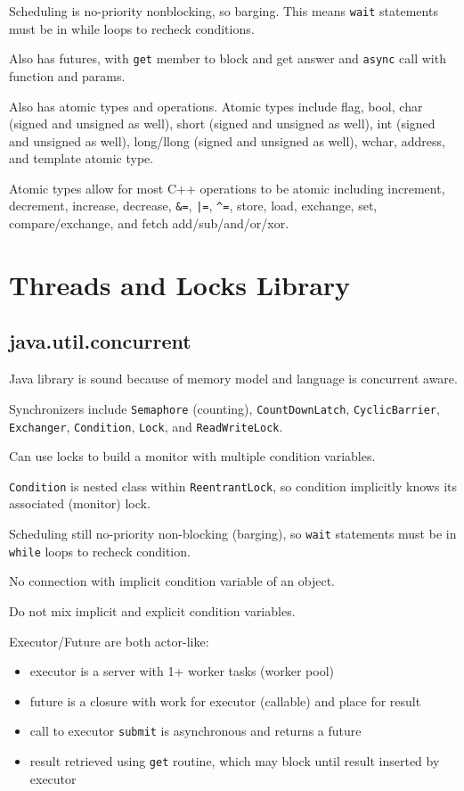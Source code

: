 \documentclass[11pt]{article}
\begin{document}
Scheduling is no-priority nonblocking, so barging.
This means \texttt{wait} statements must be in while loops to recheck
conditions.

Also has futures, with \texttt{get} member to block and get answer and
\texttt{async} call with function and params.

Also has atomic types and operations.
Atomic types include flag, bool, char (signed and unsigned as well),
short (signed and unsigned as well), int (signed and unsigned as well),
long/llong (signed and unsigned as well), wchar, address, and template
atomic type.

Atomic types allow for most C++ operations to be atomic including
increment, decrement, increase, decrease, \texttt{\&=}, \texttt{|=}, \texttt{\textasciicircum{}=},
store, load, exchange, set, compare/exchange, and fetch
add/sub/and/or/xor.
\section{Threads and Locks Library}
\label{sec:orgcc64d8e}
\subsection{java.util.concurrent}
\label{sec:org1929717}
Java library is sound because of memory model and language is concurrent
aware.

Synchronizers include \texttt{Semaphore} (counting), \texttt{CountDownLatch}, \texttt{CyclicBarrier},
\texttt{Exchanger}, \texttt{Condition}, \texttt{Lock}, and \texttt{ReadWriteLock}.

Can use locks to build a monitor with multiple condition variables.

\texttt{Condition} is nested class within \texttt{ReentrantLock}, so condition
implicitly knows its associated (monitor) lock.

Scheduling still no-priority non-blocking (barging), so \texttt{wait} statements
must be in \texttt{while} loops to recheck condition.

No connection with implicit condition variable of an object.

Do not mix implicit and explicit condition variables.

Executor/Future are both actor-like:
\begin{itemize}
\item executor is a server with 1+ worker tasks (worker pool)
\item future is a closure with work for executor (callable) and place for result
\item call to executor \texttt{submit} is asynchronous and returns a future
\item result retrieved using \texttt{get} routine, which may block until result inserted
by executor
\end{itemize}
\end{document}
